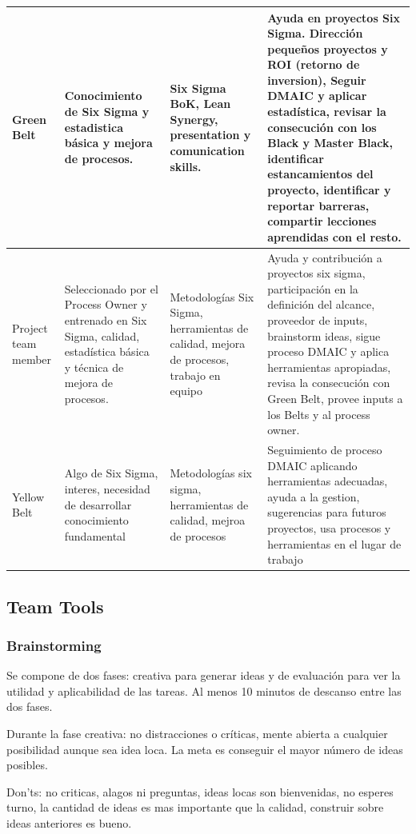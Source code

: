 \documentclass[]{article}
\begin{document}
\begin{tabular}{p{1.5cm}|p{3cm}|p{4cm}|p{7cm}}
	\hline Green Belt& Conocimiento de Six Sigma y estadistica básica y mejora de procesos. & Six Sigma BoK, Lean Synergy, presentation y comunication skills. & Ayuda en proyectos Six Sigma. Dirección pequeños proyectos y ROI (retorno de inversion), Seguir DMAIC y aplicar estadística, revisar la consecución con los Black y Master Black, identificar estancamientos del proyecto, identificar y reportar barreras, compartir lecciones aprendidas con el resto. \\
	\hline Project team member & Seleccionado por el Process Owner y entrenado en Six Sigma, calidad, estadística básica y técnica de mejora de procesos. & Metodologías Six Sigma, herramientas de calidad, mejora de procesos, trabajo en equipo & Ayuda y contribución a proyectos six sigma, participación en la definición del alcance, proveedor de inputs, brainstorm ideas, sigue proceso DMAIC y aplica herramientas apropiadas, revisa la consecución con Green Belt, provee inputs a los Belts y al process owner. \\
	\hline Yellow Belt & Algo de Six Sigma, interes, necesidad de desarrollar conocimiento fundamental & Metodologías six sigma, herramientas de calidad, mejroa de procesos & Seguimiento de proceso DMAIC aplicando herramientas adecuadas, ayuda a la gestion, sugerencias para futuros proyectos, usa procesos y herramientas en el lugar de trabajo \\
	\hline 
\end{tabular} 

\subsection{Team Tools}

\subsubsection{Brainstorming}
Se compone de dos fases: creativa para generar ideas y de evaluación para ver la utilidad y aplicabilidad de las tareas. Al menos 10 minutos de descanso entre las dos fases.

Durante la fase creativa: no distracciones o críticas, mente abierta a cualquier posibilidad aunque sea idea loca. La meta es conseguir el mayor número de ideas posibles.

Don'ts: no criticas, alagos ni preguntas, ideas locas son bienvenidas, no esperes turno, la cantidad de ideas es mas importante que la calidad, construir sobre ideas anteriores es bueno.
\end{document}
